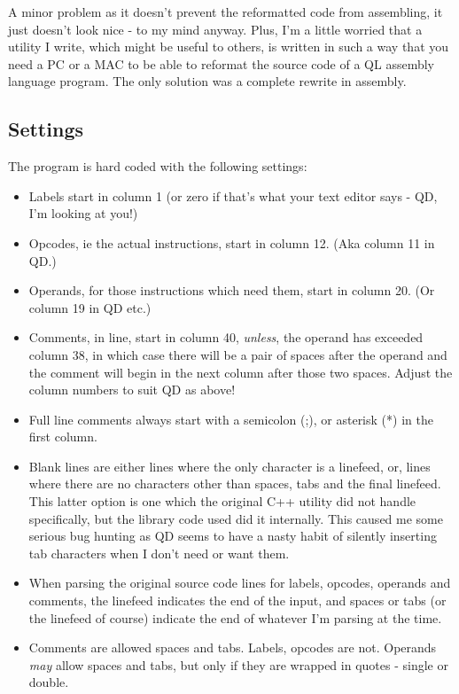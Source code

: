 A minor problem as it doesn't prevent the reformatted code from assembling, it just doesn't look nice - to my mind anyway. Plus, I'm a little worried that a utility I write, which might be useful to others, is written in such a way that you need a PC or a MAC to be able to reformat the source code of a QL assembly language program. The only solution was a complete rewrite in assembly.

\subsection{Settings}

The program is hard coded with the following settings:

\begin{itemize}
	\item Labels start in column 1 (or zero if that's what your text editor says - QD, I'm looking at you!)
	\item Opcodes, ie the actual instructions, start in column 12. (Aka column 11 in QD.)
	\item Operands, for those instructions which need them, start in column 20. (Or column 19 in QD etc.)
	\item Comments, in line, start in column 40, \emph{unless}, the operand has exceeded column 38, in which case there will be a pair of spaces after the operand and the comment will begin in the next column after those two spaces. Adjust the column numbers to suit QD as above!
	\item Full line comments always start with a semicolon (;), or asterisk (*) in the first column.
	\item Blank lines are either lines where the only character is a linefeed, or, lines where there are no characters other than spaces, tabs and the final linefeed. This latter option is one which the original C++ utility did not handle specifically, but the library code used did it internally. This caused me some serious bug hunting as QD seems to have a nasty habit of silently inserting tab characters when I don't need or want them.
	\item When parsing the original source code lines for labels, opcodes, operands and comments, the linefeed indicates the end of the input, and spaces or tabs (or the linefeed of course) indicate the end of whatever I'm parsing at the time.
	\item Comments are allowed spaces and tabs. Labels, opcodes are not. Operands \emph{may} allow spaces and tabs, but only if they are wrapped in quotes - single or double.
\end{itemize}

